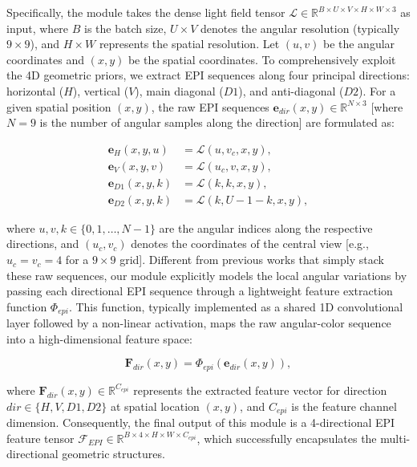 \documentclass[lettersize,journal]{IEEEtran}
\begin{document}
Specifically, the module takes the dense light field tensor $\mathcal{L} \in \mathbb{R}^{B \times U \times V \times H \times W \times 3}$ as input, where $B$ is the batch size, $U \times V$ denotes the angular resolution (typically $9 \times 9$), and $H \times W$ represents the spatial resolution. Let $(u, v)$ be the angular coordinates and $(x, y)$ be the spatial coordinates. To comprehensively exploit the 4D geometric priors, we extract EPI sequences along four principal directions: horizontal ($H$), vertical ($V$), main diagonal ($D1$), and anti-diagonal ($D2$). For a given spatial position $(x, y)$, the raw EPI sequences $\mathbf{e}_{dir}(x, y) \in \mathbb{R}^{N \times 3}$  [where $N=9$ is the number of angular samples along the direction] are formulated as:

\begin{align}

\mathbf{e}_{H}(x, y, u) &= \mathcal{L}(u, v_c, x, y), \\
\mathbf{e}_{V}(x, y, v) &= \mathcal{L}(u_c, v, x, y), \\
\mathbf{e}_{D1}(x, y, k) &= \mathcal{L}(k, k, x, y), \\
\mathbf{e}_{D2}(x, y, k) &= \mathcal{L}(k, U-1-k, x, y),

\end{align}

where $u, v, k \in \{0, 1, \dots, N-1\}$ are the angular indices along the respective directions, and $(u_c, v_c)$ denotes the coordinates of the central view  [e.g., $u_c = v_c = 4$ for a $9 \times 9$ grid]. Different from previous works that simply stack these raw sequences, our module explicitly models the local angular variations by passing each directional EPI sequence through a lightweight feature extraction function $\Phi_{epi}$. This function, typically implemented as a shared 1D convolutional layer followed by a non-linear activation, maps the raw angular-color sequence into a high-dimensional feature space:

\begin{equation}
\label{eq:eq6}
\mathbf{F}_{dir}(x, y) = \Phi_{epi}(\mathbf{e}_{dir}(x, y)),
\end{equation}

where $\mathbf{F}_{dir}(x, y) \in \mathbb{R}^{C_{epi}}$ represents the extracted feature vector for direction $dir \in \{H, V, D1, D2\}$ at spatial location $(x, y)$, and $C_{epi}$ is the feature channel dimension. Consequently, the final output of this module is a 4-directional EPI feature tensor $\mathcal{F}_{EPI} \in \mathbb{R}^{B \times 4 \times H \times W \times C_{epi}}$, which successfully encapsulates the multi-directional geometric structures.
\end{document}
